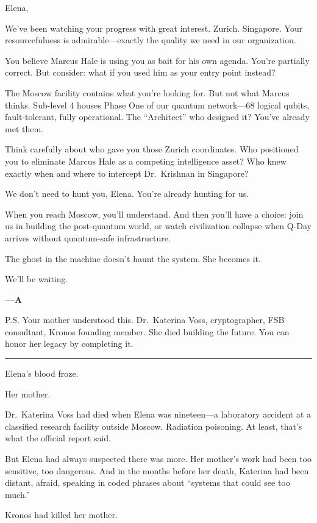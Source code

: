 \documentclass[12pt,letterpaper]{book}
\begin{document}
Elena,

We've been watching your progress with great interest. Zurich. Singapore. Your resourcefulness is admirable---exactly the quality we need in our organization.

You believe Marcus Hale is using you as bait for his own agenda. You're partially correct. But consider: what if you used him as your entry point instead?

The Moscow facility contains what you're looking for. But not what Marcus thinks. Sub-level 4 houses Phase One of our quantum network---68 logical qubits, fault-tolerant, fully operational. The ``Architect'' who designed it? You've already met them.

Think carefully about who gave you those Zurich coordinates. Who positioned you to eliminate Marcus Hale as a competing intelligence asset? Who knew exactly when and where to intercept Dr.~Krishnan in Singapore?

We don't need to hunt you, Elena. You're already hunting for us.

When you reach Moscow, you'll understand. And then you'll have a choice: join us in building the post-quantum world, or watch civilization collapse when Q-Day arrives without quantum-safe infrastructure.

The ghost in the machine doesn't haunt the system. She becomes it.

We'll be waiting.

\textbf{---A}

P.S. Your mother understood this. Dr.~Katerina Voss, cryptographer, FSB consultant, Kronos founding member. She died building the future. You can honor her legacy by completing it.

\begin{center}\rule{0.5\linewidth}{0.5pt}\end{center}

Elena's blood froze.

Her mother.

Dr.~Katerina Voss had died when Elena was nineteen---a laboratory accident at a classified research facility outside Moscow. Radiation poisoning. At least, that's what the official report said.

But Elena had always suspected there was more. Her mother's work had been too sensitive, too dangerous. And in the months before her death, Katerina had been distant, afraid, speaking in coded phrases about ``systems that could see too much.''

Kronos had killed her mother.
\end{document}
